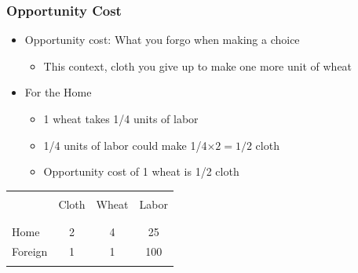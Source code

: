 \documentclass[handout]{beamer}
\begin{document}
\begin{frame}[t]
\frametitle{Opportunity Cost}
\bigskip
\begin{itemize}
\item Opportunity cost: What you forgo when making a choice
\begin{itemize}
\medskip
\item This context, cloth you give up to make one more unit of wheat
\end{itemize}
\bigskip
\item For the Home
\begin{itemize}
\medskip
\item 1 wheat takes 1/4 units of labor
\medskip
\item 1/4 units of labor could make 1/4$\times2 = 1/2$ cloth
\medskip
\item Opportunity cost of 1 wheat is 1/2 cloth
\end{itemize}
\end{itemize}
\bigskip
\begin{table}[t]
\begin{center}
\begin{tabular}{lccc}%
\vspace{-0.6cm}\\
\hline%
\hline
\vspace{-.4cm}       &\multicolumn{3}{c}{}\\
                     & Cloth  & Wheat  &  Labor \\%
\vspace{-.4cm}       &\multicolumn{3}{c}{}\\
\hline%
\vspace{-.4cm}       &\multicolumn{3}{c}{}\\
Home                 &   2    &   4     &   25  \\
Foreign              &    1    &    1     &   100  \\
\vspace{-.4cm}       &\multicolumn{3}{c}{}\\
\hline
\end{tabular}
\end{center}
\end{table}
\end{frame}

\end{document}
